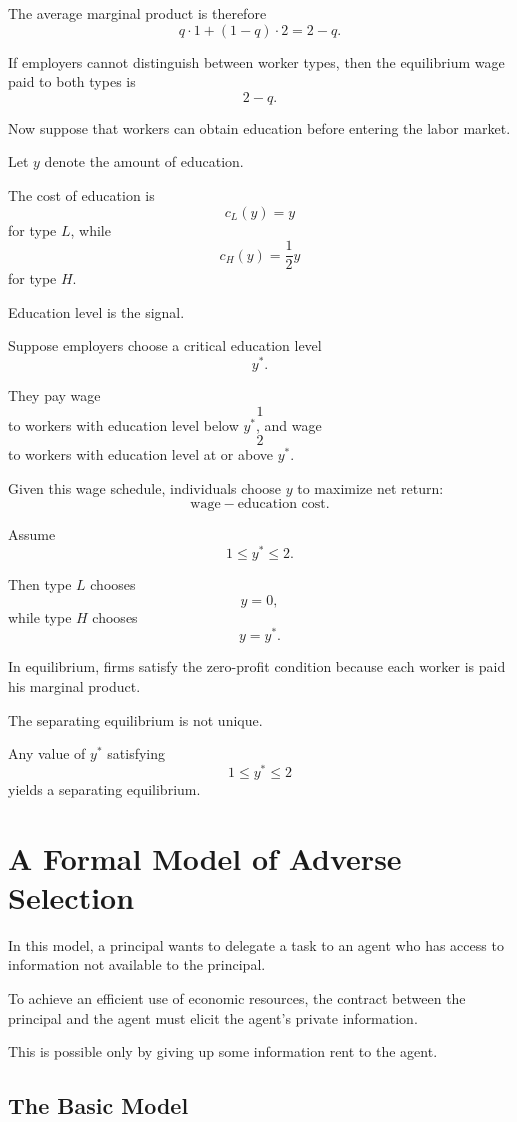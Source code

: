 The average marginal product is therefore
\[
q\cdot 1+(1-q)\cdot 2
=
2-q.
\]

If employers cannot distinguish between worker types, then the equilibrium wage paid to both types is
\[
2-q.
\]

Now suppose that workers can obtain education before entering the labor market.

Let \(y\) denote the amount of education.

The cost of education is
\[
c_L(y)=y
\]
for type \(L\), while
\[
c_H(y)=\frac{1}{2}y
\]
for type \(H\).

Education level is the signal.

Suppose employers choose a critical education level
\[
y^*.
\]

They pay wage
\[
1
\]
to workers with education level below \(y^*\), and wage
\[
2
\]
to workers with education level at or above \(y^*\).

Given this wage schedule, individuals choose \(y\) to maximize net return:
\[
\text{wage}-\text{education cost}.
\]

Assume
\[
1\le y^*\le 2.
\]

Then type \(L\) chooses
\[
y=0,
\]
while type \(H\) chooses
\[
y=y^*.
\]

In equilibrium, firms satisfy the zero-profit condition because each worker is paid his marginal product.

The separating equilibrium is not unique.

Any value of \(y^*\) satisfying
\[
1\le y^*\le 2
\]
yields a separating equilibrium.

\section{A Formal Model of Adverse Selection}

In this model, a principal wants to delegate a task to an agent who has access to information not available to the principal.

To achieve an efficient use of economic resources, the contract between the principal and the agent must elicit the agent's private information.

This is possible only by giving up some information rent to the agent.

\subsection{The Basic Model}

